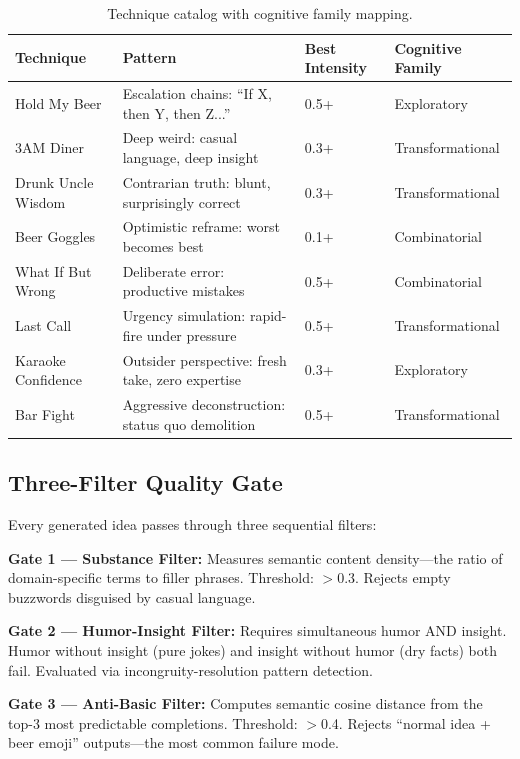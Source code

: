 \documentclass[11pt,a4paper]{article}
\begin{document}
\begin{table}[H]
\centering
\begin{tabular}{@{}llll@{}}
\toprule
\textbf{Technique} & \textbf{Pattern} & \textbf{Best Intensity} & \textbf{Cognitive Family} \\
\midrule
Hold My Beer & Escalation chains: ``If X, then Y, then Z...'' & 0.5+ & Exploratory \\
3AM Diner & Deep weird: casual language, deep insight & 0.3+ & Transformational \\
Drunk Uncle Wisdom & Contrarian truth: blunt, surprisingly correct & 0.3+ & Transformational \\
Beer Goggles & Optimistic reframe: worst becomes best & 0.1+ & Combinatorial \\
What If But Wrong & Deliberate error: productive mistakes & 0.5+ & Combinatorial \\
Last Call & Urgency simulation: rapid-fire under pressure & 0.5+ & Transformational \\
Karaoke Confidence & Outsider perspective: fresh take, zero expertise & 0.3+ & Exploratory \\
Bar Fight & Aggressive deconstruction: status quo demolition & 0.5+ & Transformational \\
\bottomrule
\end{tabular}
\caption{Technique catalog with cognitive family mapping.}
\label{tab:techniques}
\end{table}

\subsection{Three-Filter Quality Gate}

Every generated idea passes through three sequential filters:

\textbf{Gate 1 — Substance Filter:} Measures semantic content density---the ratio of domain-specific terms to filler phrases. Threshold: $>$0.3. Rejects empty buzzwords disguised by casual language.

\textbf{Gate 2 — Humor-Insight Filter:} Requires simultaneous humor AND insight. Humor without insight (pure jokes) and insight without humor (dry facts) both fail. Evaluated via incongruity-resolution pattern detection.

\textbf{Gate 3 — Anti-Basic Filter:} Computes semantic cosine distance from the top-3 most predictable completions. Threshold: $>$0.4. Rejects ``normal idea + beer emoji'' outputs---the most common failure mode.
\end{document}
